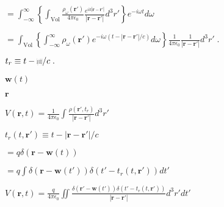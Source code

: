 \documentclass[12pt]{article}
\renewcommand{\vec}[1]{\boldsymbol{#1}}%
\def\lthtmlcheckvsize{\ifdim\ht\sizebox<\vsize 
  \ifdim\wd\sizebox<\hsize\expandafter\hfill\fi \expandafter\vfill
  \else\expandafter\vss\fi}%
\begin{document}
{\newpage\clearpage
{}%
$\displaystyle = \int_{-\infty}^\infty \left\{\int_{\text{Vol}} \frac{\rho_\omega(\vec{r}')}{4\pi \epsilon_0} \frac{e^{ik|\vec{r}-\vec{r}'|}}{ |\vec{r}-\vec{r}'|} d^3 r' \right\}e^{-i\omega t}d\omega$%
\lthtmlindisplaymathZ
\lthtmlcheckvsize\clearpage}

{\newpage\clearpage
{}%
$\displaystyle =\int_{\text{Vol}} \left\{ \int_{-\infty}^\infty\rho_\omega(\vec{r}') e^{-i\omega (t -|\vec{r}-\vec{r}'|/c)} d\omega\right\}\frac{1}{4\pi \epsilon_0} \frac{1}{ |\vec{r}-\vec{r}'|} d^3 r'  \;.$%
\lthtmlindisplaymathZ
\lthtmlcheckvsize\clearpage}

{\newpage\clearpage
{}%
$\displaystyle t_r \equiv t - {\mbox{$\resizebox{.09in}{.08in}{\texttt{[image: fonts/ScriptR]}}$}}/ c \;.$%
\lthtmlindisplaymathZ
\lthtmlcheckvsize\clearpage}

{\newpage\clearpage
{}%
$ \vec{w}(t)$%
\lthtmlindisplaymathZ
\lthtmlcheckvsize\clearpage}

{\newpage\clearpage
{}%
$ \vec{r}$%
\lthtmlindisplaymathZ
\lthtmlcheckvsize\clearpage}

{\newpage\clearpage
{}%
$\displaystyle V(\vec{r}, t) = \frac{1}{4\pi\epsilon_0}\int \frac{\rho(\vec{r}', t_r)}{|\vec{r} - \vec{r}'|} d^3r'$%
\lthtmlindisplaymathZ
\lthtmlcheckvsize\clearpage}

{\newpage\clearpage
{}%
$\displaystyle t_r(t, \vec{r}') \equiv t - |\vec{r}-\vec{r}'|/c$%
\lthtmlindisplaymathZ
\lthtmlcheckvsize\clearpage}

{\newpage\clearpage
{}%
$\displaystyle = q \delta(\vec{r} - \vec{w}(t))$%
\lthtmlindisplaymathZ
\lthtmlcheckvsize\clearpage}

{\newpage\clearpage
{}%
$\displaystyle = q \int  \delta(\vec{r} - \vec{w}(t')) \delta(t' - t_r(t, \vec{r}'))  dt'$%
\lthtmlindisplaymathZ
\lthtmlcheckvsize\clearpage}

{\newpage\clearpage
{}%
$\displaystyle V(\vec{r}, t) = \frac{q}{4\pi\epsilon_0}\iint \frac{  \delta(\vec{r}' - \vec{w}(t')) \delta(t' - t_r(t, \vec{r}'))  }{|\vec{r} - \vec{r}'|} d^3r' dt'$%
\lthtmlindisplaymathZ
\lthtmlcheckvsize\clearpage}
\end{document}
